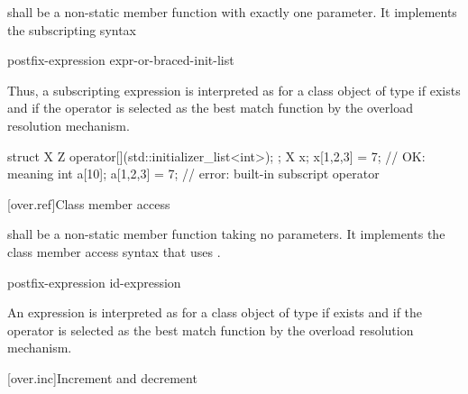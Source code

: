 \pnum
{}
shall be a non-static member function with exactly one parameter.
It implements the subscripting syntax

\begin{ncsimplebnf}
postfix-expression \terminal{[} expr-or-braced-init-list \terminal{]}
\end{ncsimplebnf}

Thus, a subscripting expression
is interpreted as
for a class object
of type
if
exists and if the operator is selected as the best match function by
the overload resolution mechanism.
\begin{example}
\begin{codeblock}
struct X {
  Z operator[](std::initializer_list<int>);
};
X x;
x[{1,2,3}] = 7;                 // OK: meaning 
int a[10];
a[{1,2,3}] = 7;                 // error: built-in subscript operator
\end{codeblock}
\end{example}

[over.ref]{Class member access}
%

\pnum
{}
shall be a non-static member function taking no parameters.
It implements the class member access syntax that
uses \tcode{->}.

\begin{ncsimplebnf}
postfix-expression \terminal{->}  id-expression
\end{ncsimplebnf}

An expression
is interpreted as
for a class object
of type
if
exists and if the operator is selected as the best match function by
the overload resolution mechanism.

[over.inc]{Increment and decrement}
%
%
%
%

